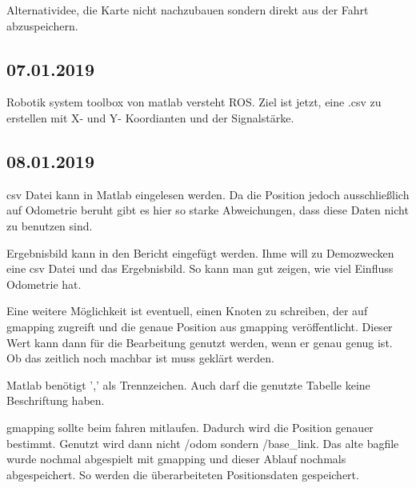 \documentclass{scrartcl}%
\begin{document}
Alternatividee, die Karte nicht nachzubauen sondern direkt aus der Fahrt abzuspeichern.

\subsection{07.01.2019}
Robotik system toolbox von matlab versteht ROS. Ziel ist jetzt, eine .csv zu erstellen mit X- und Y- Koordianten und der Signalstärke.

\subsection{08.01.2019}
csv Datei kann in Matlab eingelesen werden. Da die Position jedoch ausschließlich auf Odometrie beruht gibt es hier so starke Abweichungen, dass diese Daten nicht zu benutzen sind.

Ergebnisbild kann in den Bericht eingefügt werden. Ihme will zu Demozwecken eine csv Datei und das Ergebnisbild. So kann man gut zeigen, wie viel Einfluss Odometrie hat.

Eine weitere Möglichkeit ist eventuell, einen Knoten zu schreiben, der auf gmapping zugreift und die genaue Position aus gmapping veröffentlicht. Dieser Wert kann dann für die Bearbeitung genutzt werden, wenn er genau genug ist. Ob das zeitlich noch machbar ist muss geklärt werden.

Matlab benötigt ',' als Trennzeichen. Auch darf die genutzte Tabelle keine Beschriftung haben.

gmapping sollte beim fahren mitlaufen. Dadurch wird die Position genauer bestimmt. Genutzt wird dann nicht /odom sondern /base\_link. Das alte bagfile wurde nochmal abgespielt mit gmapping und dieser Ablauf nochmals abgespeichert. So werden die überarbeiteten Positionsdaten gespeichert.
\end{document}
